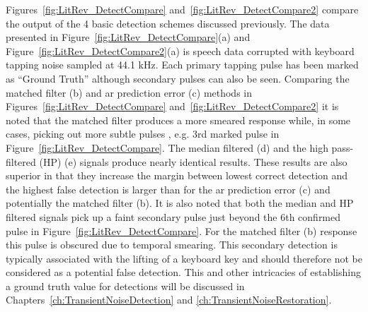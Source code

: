 Figures~\ref{fig:LitRev_DetectCompare} and~\ref{fig:LitRev_DetectCompare2} compare the output of the 4 basic detection schemes discussed previously. The data presented in Figure~\ref{fig:LitRev_DetectCompare}(a) and Figure~\ref{fig:LitRev_DetectCompare2}(a) is speech data corrupted with keyboard tapping noise sampled at 44.1 kHz. Each primary tapping pulse has been marked as ``Ground Truth'' although secondary pulses can also be seen. Comparing the matched filter (b) and \DIFdelbegin {}\DIFdelend \DIFaddbegin \gls{ar} \DIFaddend prediction error (c) methods in Figures~\ref{fig:LitRev_DetectCompare} and~\ref{fig:LitRev_DetectCompare2} it is noted that the matched filter produces a more smeared response while, in some cases, picking out more subtle pulses \cite{Godsill1998book}, e.g. 3rd marked pulse in Figure~\ref{fig:LitRev_DetectCompare}. The median filtered (d) and the high pass-filtered (HP) (e) signals produce nearly identical results. These results are also superior in that they increase the margin between lowest correct detection and the highest false detection is larger than for the \DIFdelbegin {}\DIFdelend \DIFaddbegin \gls{ar} \DIFaddend prediction error (c) and potentially the matched filter (b). It is also noted that both the median and HP filtered signals pick up a faint secondary pulse just beyond the 6th confirmed pulse in Figure~\ref{fig:LitRev_DetectCompare}. For the matched filter (b) response this pulse is obscured due to temporal smearing. This secondary detection is typically associated with the lifting of a keyboard key and should therefore not be considered as a potential false detection. This and other intricacies of establishing a ground truth value for detections will be discussed in Chapters~\ref{ch:TransientNoiseDetection} and \ref{ch:TransientNoiseRestoration}.

